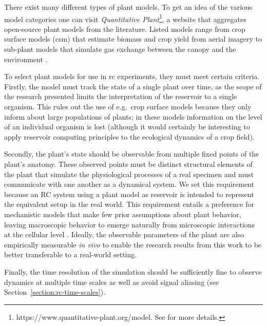 
There exist many different types of plant models.
To get an idea of the various model categories one can visit \textit{Quantitative Plant}\footnote[1]{https://www.quantitative-plant.org/model. See \citet{lobet_online_2013, lobet_image_2017} for more details.}, 
a website that aggregates open-source plant models from the literature.
Listed models range from crop surface models (\acrshort{csm}) that estimate biomass and crop yield from aerial imagery \citep{tilly_multitemporal_2014} to sub-plant models that simulate gas exchange between the canopy and the environment \citep{sinoquet_ratp_2001}.


To select plant models for use in \acrshort{rc} experiments, they must meet certain criteria. 
Firstly, the model must track the state of a single plant over time, 
as the scope of the research presented limits the interpretation of the reservoir to a single organism.
This rules out the use of e.g.\ crop surface models because they only inform about large populations of plants; in these models information on the level of an individual organism is lost (although it would certainly be interesting to apply reservoir computing principles to the ecological dynamics of a crop field).


Secondly, the plant's state should be observable from multiple fixed points of the plant's anatomy. 
These observed points must be distinct structural elements of the plant that simulate the physiological processes of a real specimen and must communicate with one another as a dynamical system.
We set this requirement because an RC system using a plant model as reservoir is intended to represent the equivalent setup in the real world.
This requirement entails a preference for mechanistic models that make few prior assumptions about plant behavior, leaving macroscopic behavior to emerge naturally from microscopic interactions at the cellular level \citep{gauthier_functional_2020}.
Ideally, the observable parameters of the plant are also empirically measurable \textit{in vivo} to enable the research results from this work to be better transferable to a real-world setting.


Finally, the time resolution of the simulation should be sufficiently fine to observe dynamics at multiple time scales as well as avoid signal aliasing (see \mbox{Section \ref{section:rc-time-scales}}).

